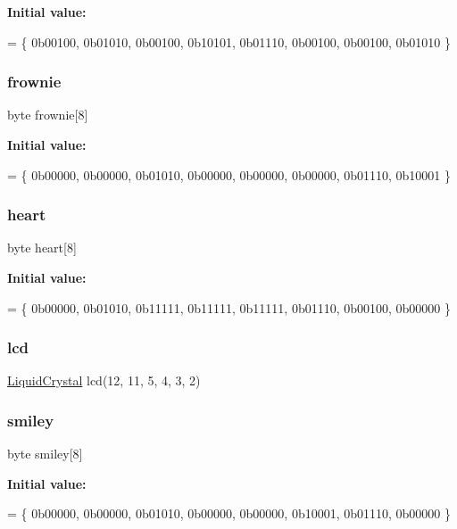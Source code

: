 {\bfseries Initial value\+:}
\begin{DoxyCode}
= \{
  0b00100,
  0b01010,
  0b00100,
  0b10101,
  0b01110,
  0b00100,
  0b00100,
  0b01010
\}
\end{DoxyCode}
\mbox{\label{_custom_character_8ino_a5e04029abaae9241644e7b46184851f9}} 
\subsubsection{\texorpdfstring{frownie}{frownie}}
{\footnotesize\ttfamily byte frownie\mbox{[}8\mbox{]}}

{\bfseries Initial value\+:}
\begin{DoxyCode}
= \{
  0b00000,
  0b00000,
  0b01010,
  0b00000,
  0b00000,
  0b00000,
  0b01110,
  0b10001
\}
\end{DoxyCode}
\mbox{\label{_custom_character_8ino_a60aa6865d4e8dab6d4142ca2ac525ce6}} 
\subsubsection{\texorpdfstring{heart}{heart}}
{\footnotesize\ttfamily byte heart\mbox{[}8\mbox{]}}

{\bfseries Initial value\+:}
\begin{DoxyCode}
= \{
  0b00000,
  0b01010,
  0b11111,
  0b11111,
  0b11111,
  0b01110,
  0b00100,
  0b00000
\}
\end{DoxyCode}
\mbox{\label{_custom_character_8ino_a7226623e632d4109904c86009c9f3b60}} 
\subsubsection{\texorpdfstring{lcd}{lcd}}
{\footnotesize\ttfamily \hyperlink{class_liquid_crystal}{Liquid\+Crystal} lcd(12, 11, 5, 4, 3, 2)}

\mbox{\label{_custom_character_8ino_a276fa84b8570a88f4c9fa4b8700316e8}} 
\subsubsection{\texorpdfstring{smiley}{smiley}}
{\footnotesize\ttfamily byte smiley\mbox{[}8\mbox{]}}

{\bfseries Initial value\+:}
\begin{DoxyCode}
= \{
  0b00000,
  0b00000,
  0b01010,
  0b00000,
  0b00000,
  0b10001,
  0b01110,
  0b00000
\}
\end{DoxyCode}
